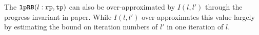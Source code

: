 %

The $\mathtt{lpRB}(l:\mathtt{rp}, \mathtt{tp})$ 
can also be over-approximated by
$I(l, l')$ through the progress invariant in paper\cite{GulwaniJK09}.
While $I(l, l')$ over-approximates this value largely
by estimating the bound on iteration numbers of $l'$ in one iteration of $l$.

